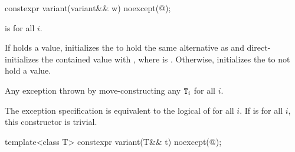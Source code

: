 %
\begin{itemdecl}
constexpr variant(variant&& w) noexcept(@\seebelow@);
\end{itemdecl}

\begin{itemdescr}
\pnum
\constraints
{} is  for all $i$.

\pnum
\effects
If  holds a value, initializes the  to hold the same
alternative as  and direct-initializes the contained value with
, where  is .
Otherwise, initializes the  to not hold a value.

\pnum
\throws
Any exception thrown by move-constructing any $\texttt{T}_i$ for all $i$.

\pnum
\remarks
The exception specification is equivalent to the logical  of
 for all $i$.
If 
is  for all $i$, this constructor is trivial.
\end{itemdescr}

%
\begin{itemdecl}
template<class T> constexpr variant(T&& t) noexcept(@\seebelow@);
\end{itemdecl}


